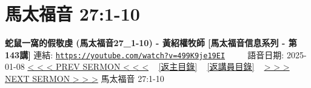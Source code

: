 \documentclass{book}
\begin{document}
\section{馬太福音 27:1-10}
\label{sec:499K9je19EI}
\textbf{蛇鼠一窩的假敬虔 (馬太福音27\_1-10) -  黃紹權牧師 [馬太福音信息系列 - 第143講]}
\newline
\newline
連結: \href{https://youtube.com/watch?v=499K9je19EI}{\texttt{https://youtube.com/watch?v=499K9je19EI}} ~~~~ 語音日期: 2025-01-08
\newline
\newline
\hyperref[sec:9Y2Bozsh9Bw]{< < < PREV SERMON < < <}
~
\hyperlink{toc}{[返主目錄]}
~
\hyperref[ch:preacher18]{[返講員目錄]}
~
\hyperref[sec:ZN4O4BAmHMA]{> > > NEXT SERMON > > >}
\newline
\newline
馬太福音 27:1-10
\newline
\end{document}
